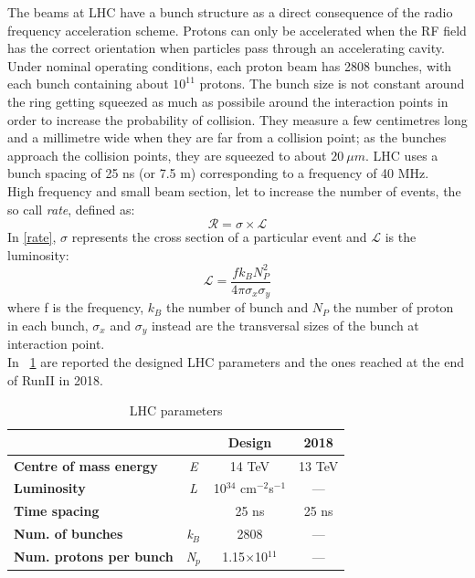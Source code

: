 The beams at LHC have a bunch structure as a direct consequence of the radio frequency acceleration scheme. Protons can only be accelerated when the RF field has the correct orientation when particles pass through an accelerating cavity. Under nominal operating conditions, each proton beam has 2808 bunches, with each bunch containing about $10^{11}$ protons. The bunch size is not constant around the ring getting squeezed as much as possibile around the interaction points in order to increase the probability of collision. They measure a few centimetres long and a millimetre wide when they are far from a collision point; as the bunches approach  the collision points, they are squeezed to about $20\ \mu m$. LHC uses a bunch spacing of 25 ns (or 7.5 m) corresponding to a frequency of 40 MHz. \\
High frequency and small beam section, let to increase the number of events, the so call \textit{rate}, defined as:
\begin{equation}
\mathcal{R} = \sigma \times \mathcal{L}
\label{rate}
\end{equation}
In \ref{rate}, $\sigma$ represents the cross section of a particular event and $\mathcal{L}$ is the luminosity:
\begin{equation}
\mathcal{L} = \frac{f k_{B} N^{2}_{P}}{4 \pi \sigma_{x} \sigma_{y}}
\label{luminosity}
\end{equation}
where f is the frequency, $k_{B}$ the number of bunch and $N_{P}$ the number of proton in each bunch, $\sigma_{x}$ and $\sigma_{y}$ instead are the transversal sizes of the bunch at interaction point. \\
In \tablename~\ref{LHC_parameteres} are reported the designed LHC parameters and the ones reached at the end of RunII in 2018.
\begin{table}[htbp]	
	\begin{center}
		\begin{tabular}{p{6cm}*{3}{c}}
			\hline   &  & Design & 2018  \\
			\hline
			\hline
			\bfseries Centre of mass energy & \emph{E} & 14 TeV & 13 TeV \\
			\hline
			\bfseries Luminosity & \emph{L} & 10$^{34}$ cm$^{-2}$s$^{-1}$ & --- \\
			\hline
			\bfseries Time spacing &  & 25 ns & 25 ns\\
			\hline
			\bfseries Num. of bunches& \emph{k$_{B}$} & 2808 & ---\\
			\hline
			\bfseries Num. protons per bunch & \emph{N$_{p}$} & 1.15$\times$10$^{11}$ & ---\\
			\hline
			\hline
		\end{tabular}
	\end{center}
	\caption{LHC parameters}
	\label{LHC_parameteres}
\end{table}

